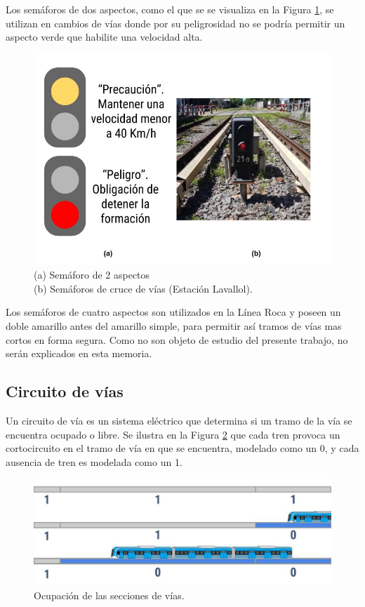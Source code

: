 			Los semáforos de dos aspectos, como el que se se visualiza en la Figura \ref{fig:Sem_2Aspectos}, se utilizan en cambios de vías donde por su peligrosidad no se podría permitir un aspecto verde que habilite una velocidad alta. 		
			 
			 \begin{figure}[htbp!]
				\centering
				\includegraphics[scale=.35]{./Figures/Sem2}
				\caption{(a) Semáforo de 2 aspectos\\(b) Semáforos de cruce de vías (Estación Lavallol).}
				\label{fig:Sem_2Aspectos}
			\end{figure}				
			
			Los semáforos de cuatro aspectos son utilizados en la Línea Roca y poseen un doble amarillo antes del amarillo simple, para permitir así tramos de vías mas cortos en forma segura. Como no son objeto de estudio del presente trabajo, no serán explicados en esta memoria.
		
		\subsection{Circuito de vías}
			Un circuito de vía es un sistema eléctrico que determina si un tramo de la vía se encuentra ocupado o libre. Se ilustra en la Figura \ref{fig:Ocupacion} que cada tren provoca un cortocircuito en el tramo de vía en que se encuentra, modelado como un 0, y cada ausencia de tren es modelada como un 1.
			
			\begin{figure}[h]
				\centering
				\includegraphics[scale=.4]{./Figures/Ocupacion}
				\caption{Ocupación de las secciones de vías.}
				\label{fig:Ocupacion}
			\end{figure}
			
